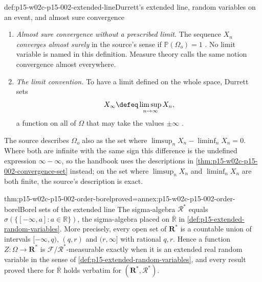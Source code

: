 \begin{hbdefinition}{def:p15-w02c-p15-002-extended-line}{Durrett's extended line, random variables on an event, and almost sure convergence}
\begin{enumerate}
      written out in full, as
      \(\{\liminf_nX_n=\limsup_nX_n\}\), when it is meant.
\item \emph{Almost sure convergence without a prescribed limit.} The
      sequence \(X_n\) \emph{converges almost surely} in the source's
      sense if \(\mathbb P(\Omega_o)=1\)
      \cite[pp.~16--17]{DurrettPTEAuthor2019}. No limit variable is named
      in this definition. Measure theory calls the same notion
      convergence almost everywhere.
\item \emph{The limit convention.} To have a limit defined on the whole
      space, Durrett sets
      \[
       X_\infty\defeq\limsup_{n\to\infty}X_n ,
      \]
      a function on all of \(\Omega\) that may take the values
      \(\pm\infty\) \cite[p.~17]{DurrettPTEAuthor2019}.
\end{enumerate}
The source describes \(\Omega_o\) also as the set where
\(\limsup_nX_n-\liminf_nX_n=0\). Where both are infinite with the same
sign this difference is the undefined expression \(\infty-\infty\), so
the handbook uses the descriptions in
\cref{thm:p15-w02c-p15-002-convergence-set} instead; on the set where
\(\limsup_nX_n\) and \(\liminf_nX_n\) are both finite, the source's
description is exact.
\end{hbdefinition}

\begin{hbtheorem}{thm:p15-w02c-p15-002-order-borel}{proved=annex:p15-w02c-p15-002-order-borel}{Borel sets of the extended line}
The sigma-algebra \(\mathcal R^*\) equals
\(\sigma(\{[-\infty,a]:a\in\mathbb R\})\), the sigma-algebra placed on
\(\overline{\mathbb R}\) in \cref{def:p15-extended-random-variables}. More
precisely, every open set of \(\mathbf R^*\) is a countable union of
intervals \([-\infty,q)\), \((q,r)\) and \((r,\infty]\) with rational
\(q,r\). Hence a function \(Z:\Omega\to\mathbf R^*\) is
\(\mathcal F/\mathcal R^*\)-measurable exactly when it is an extended real
random variable in the sense of
\cref{def:p15-extended-random-variables}, and every result proved there
for \(\overline{\mathbb R}\) holds verbatim for \((\mathbf R^*,\mathcal R^*)\).
\end{hbtheorem}

